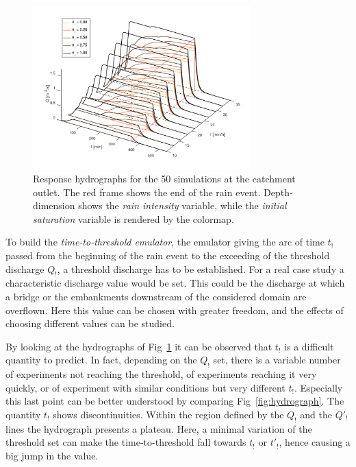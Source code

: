 \begin{figure}[h]
  \centering
  \includegraphics[width=0.75\textwidth]{Figures/hydrographs3d.png}
  \caption{Response hydrographs for the \num{50} simulations at the catchment outlet. The red frame shows the end of the rain event. Depth-dimension shows the \emph{rain intensity} variable, while the \emph{initial saturation} variable is rendered by the colormap.}
  \label{fig:hydrographs3d}
\end{figure}

To build the \emph{time-to-threshold emulator}, the emulator giving the arc of time $t_!$ passed from the beginning of the rain event to the exceeding of the threshold discharge $Q_!$, a threshold discharge has to be established.
For a real case study a characteristic discharge value would be set.
This could be the discharge at which a bridge or the embankments downstream of the considered domain are overflown.
Here this value can be chosen with greater freedom, and the effects of choosing different values can be studied.

By looking at the hydrographs of Fig~\ref{fig:hydrographs3d} it can be observed that $t_!$ is a difficult quantity to predict.
In fact, depending on the $Q_!$ set, there is a variable number of experiments not reaching the threshold, of experiments reaching it very quickly, or of experiment with similar conditions but very different $t_!$.
Especially this last point can be better understood by comparing Fig~\ref{fig:hydrograph}.
The quantity $t_!$ shows discontinuities.
Within the region defined by the $Q_!$ and the $Q'_!$ lines the hydrograph presents a plateau.
Here, a minimal variation of the threshold set can make the time-to-threshold fall towards $t_!$ or $t'_!$, hence causing a big jump in the value.

